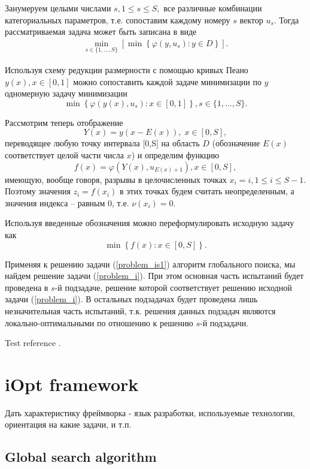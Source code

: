 \documentclass[preprint,12pt]{elsarticle}
\begin{document}
Занумеруем целыми числами $s, 1\leq s \leq S,$ все различные комбинации категориальных параметров, т.е. сопоставим каждому номеру $s$ вектор $u_s$. 
Тогда рассматриваемая задача может быть записана в виде 
\begin{gather}\label{problem_is}
 \min_{s\in\{1,...,S\}}\left[\min{\left\{ \varphi(y,u_s) : y\in D \right\}}\right].
\end{gather}

Используя схему редукции размерности с помощью кривых Пеано $y(x), x\in [0,1]$ можно сопоставить каждой задаче минимизации по $y$ одномерную задачу минимизации
\[
 \min{\left\{ \varphi(y(x),u_s): x \in [0,1] \right\}}, s \in \{1,...,S\}.
\]

Рассмотрим теперь отображение 
\[
Y(x)=y(x-E(x)), \; x\in[0,S],
\]
переводящее любую точку интервала [0,S] на область $D$ (обозначение $E(x)$ соответствует целой части числа $x$) и определим функцию 
\[
f(x) = \varphi(Y(x),u_{E(x)+1}), x\in[0,S],
\]
имеющую, вообще говоря, разрывы в целочисленных точках $x_i = i, 1\leq i \leq S-1$.
Поэтому значения  $z_i = f(x_i)$ в этих точках будем считать неопределенным, а значения индекса -- равным 0, т.е. $\nu(x_i) = 0$.

Используя введенные обозначения можно переформулировать исходную задачу как
\begin{equation}\label{problem_is1}
\min \left\{f(x): x \in [0,S] \right\}.
\end{equation}

Применяя к решению задачи (\ref{problem_is1}) алгоритм глобального поиска, мы найдем решение задачи (\ref{problem_i}). При этом основная часть испытаний будет проведена в $s$-й подзадаче, решение которой соответствует решению исходной задачи (\ref{problem_i}). В остальных подзадачах будет проведена лишь незначительная часть испытаний, т.к. решения данных подзадач являются локально-оптимальными по отношению к решению $s$-й подзадачи.


Test reference \cite{Strongin2000,Barkalov2021}.


\section{iOpt framework} 
\label{sec_iOpt}

Дать характеристику фреймворка - язык разработки, используемые технологии, ориентация на какие задачи, и т.п. 


\subsection{Global search algorithm}
\label{sec_GSA}
\end{document}
